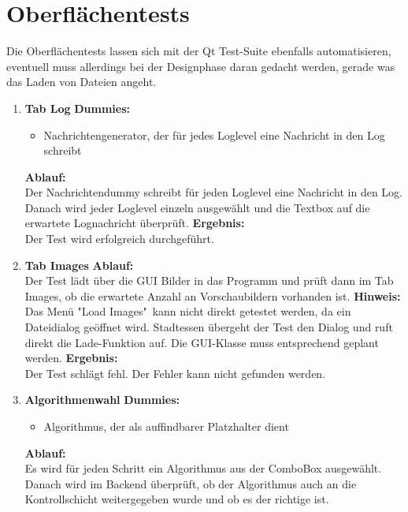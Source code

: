\section{Oberflächentests}
Die Oberflächentests lassen sich mit der Qt Test-Suite ebenfalls automatisieren, eventuell muss allerdings bei der Designphase daran gedacht werden, gerade was das Laden von Dateien angeht.\\
\begin{enumerate}[align=left, leftmargin=4em, label={\textbf{\textbackslash T3.\arabic*\textbackslash}} ]
	\item \textbf{Tab Log}
	\subitem\textbf{Dummies:} \begin{itemize}
		\item Nachrichtengenerator, der für jedes Loglevel eine Nachricht in den Log schreibt
	\end{itemize}
	\subitem\textbf{Ablauf:}\\ Der Nachrichtendummy schreibt für jeden Loglevel eine Nachricht in den Log. Danach wird jeder Loglevel einzeln ausgewählt und die Textbox auf die erwartete Lognachricht überprüft.
	\subitem\textbf{Ergebnis:}\\
	Der Test wird erfolgreich durchgeführt.
	\\\item \textbf{Tab Images}
	\subitem \textbf{Ablauf:}\\ Der Test lädt über die GUI Bilder in das Programm und prüft dann im Tab Images, ob die erwartete Anzahl an Vorschaubildern vorhanden ist.
	\subitem \textbf{Hinweis:}\\
	Das Menü "{}Load Images" kann nicht direkt getestet werden, da ein Dateidialog geöffnet wird. Stadtessen übergeht der Test den Dialog und ruft direkt die Lade-Funktion auf. Die GUI-Klasse muss entsprechend geplant werden.
	\subitem\textbf{Ergebnis:}\\
	Der Test schlägt fehl. Der Fehler kann nicht gefunden werden.
	\\\item \textbf{Algorithmenwahl}
	\subitem \textbf{Dummies:}\begin{itemize}
		\item Algorithmus, der als auffindbarer Platzhalter dient
	\end{itemize}
	\subitem \textbf{Ablauf:}\\ Es wird für jeden Schritt ein Algorithmus aus der ComboBox ausgewählt. Danach wird im Backend überprüft, ob der Algorithmus auch an die Kontrollschicht weitergegeben wurde und ob es der richtige ist.

\end{enumerate}
